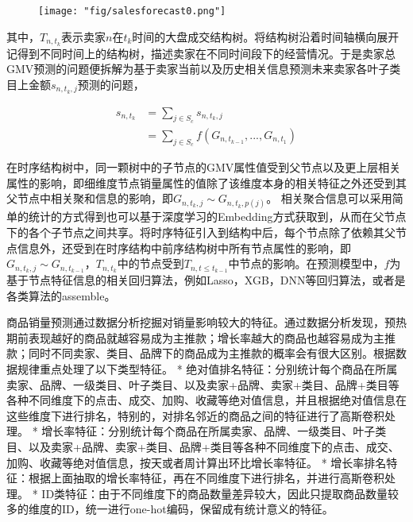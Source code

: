 \begin{figure}[!h]
	\centering
	\texttt{[image: "fig/salesforecast0.png"]}
	\caption{}
	\label{fig:sf0}
\end{figure}

其中，$T_{n,t_k}$表示卖家$n$在$t_k$时间的大盘成交结构树。将结构树沿着时间轴横向展开记得到不同时间上的结构树，描述卖家在不同时间段下的经营情况。于是卖家总GMV预测的问题便拆解为基于卖家当前以及历史相关信息预测未来卖家各叶子类目上金额$s_{n,t_{k},j}$预测的问题，

\begin{align}
s_{n,t_k} &= \sum_{j \in S_c}s_{n,t_k,j} \\
&= \sum_{j \in S_c}f(G_{n,t_{k-1}},...,G_{n,t_1})
\end{align}

在时序结构树中，同一颗树中的子节点的GMV属性值受到父节点以及更上层相关属性的影响，即细维度节点销量属性的值除了该维度本身的相关特征之外还受到其父节点中相关聚和信息的影响，即$G_{n,t_{k},j} \sim G_{n,t_{k},p(j)}$。 相关聚合信息可以采用简单的统计的方式得到也可以基于深度学习的Embedding方式获取到，从而在父节点下的各个子节点之间共享。将时序特征引入到结构中后，每个节点除了依赖其父节点信息外，还受到在时序结构中前序结构树中所有节点属性的影响，即$G_{n,t_{k},j} \sim G_{n,t_{k-1}}$，$T_{n,t_k}$中的节点受到$T_{n,t\le t_{k-1}}$中节点的影响。在预测模型中，$f$为基于节点特征信息的相关回归算法，例如Lasso，XGB，DNN等回归算法，或者是各类算法的assemble。

商品销量预测通过数据分析挖掘对销量影响较大的特征。通过数据分析发现，预热期前表现越好的商品就越容易成为主推款；增长率越大的商品也越容易成为主推款；同时不同卖家、类目、品牌下的商品成为主推款的概率会有很大区别。根据数据规律重点处理了以下类型特征。
* 绝对值排名特征：分别统计每个商品在所属卖家、品牌、一级类目、叶子类目、以及卖家+品牌、卖家+类目、品牌+类目等各种不同维度下的点击、成交、加购、收藏等绝对值信息，并且根据绝对值信息在这些维度下进行排名，特别的，对排名邻近的商品之间的特征进行了高斯卷积处理。
* 增长率特征：分别统计每个商品在所属卖家、品牌、一级类目、叶子类目、以及卖家+品牌、卖家+类目、品牌+类目等各种不同维度下的点击、成交、加购、收藏等绝对值信息，按天或者周计算出环比增长率特征。
* 增长率排名特征：根据上面抽取的增长率特征，再在不同维度下进行排名，并进行高斯卷积处理。
* ID类特征：由于不同维度下的商品数量差异较大，因此只提取商品数量较多的维度的ID，统一进行one-hot编码，保留成有统计意义的特征。

